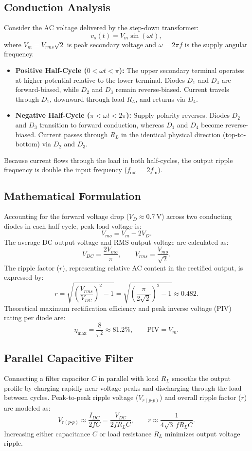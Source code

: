 \subsection{Conduction Analysis}
Consider the AC voltage delivered by the step-down transformer:
\[
v_s(t) = V_m \sin(\omega t),
\]
where $V_m = V_{rms}\sqrt{2}$ is peak secondary voltage and $\omega = 2\pi f$ is the supply angular frequency.
\begin{itemize}
	\item \textbf{Positive Half-Cycle ($0 < \omega t < \pi$):} The upper secondary terminal operates at higher potential relative to the lower terminal. Diodes $D_1$ and $D_4$ are forward-biased, while $D_2$ and $D_3$ remain reverse-biased. Current travels through $D_1$, downward through load $R_L$, and returns via $D_4$.
	\item \textbf{Negative Half-Cycle ($\pi < \omega t < 2\pi$):} Supply polarity reverses. Diodes $D_2$ and $D_3$ transition to forward conduction, whereas $D_1$ and $D_4$ become reverse-biased. Current passes through $R_L$ in the identical physical direction (top-to-bottom) via $D_2$ and $D_3$.
\end{itemize}
Because current flows through the load in both half-cycles, the output ripple frequency is double the input frequency ($f_{\text{out}} = 2 f_{\text{in}}$).

\subsection{Mathematical Formulation}
Accounting for the forward voltage drop ($V_D \approx \qty{0.7}{\volt}$) across two conducting diodes in each half-cycle, peak load voltage is:
\[
V_{mo} = V_m - 2V_D.
\]
The average DC output voltage and RMS output voltage are calculated as:
\[
V_{DC} = \frac{2V_{mo}}{\pi}, \qquad V_{rms} = \frac{V_{mo}}{\sqrt{2}}.
\]
The ripple factor ($r$), representing relative AC content in the rectified output, is expressed by:
\[
r = \sqrt{\left(\frac{V_{rms}}{V_{DC}}\right)^2 - 1} = \sqrt{\left(\frac{\pi}{2\sqrt{2}}\right)^2-1} \approx 0.482.
\]
Theoretical maximum rectification efficiency and peak inverse voltage (PIV) rating per diode are:
\[
\eta_{\max} = \frac{8}{\pi^2}\approx 81.2\%, \qquad \text{PIV} = V_m.
\]

\subsection{Parallel Capacitive Filter}
Connecting a filter capacitor $C$ in parallel with load $R_L$ smooths the output profile by charging rapidly near voltage peaks and discharging through the load between cycles. Peak-to-peak ripple voltage ($V_{r(p\text{-}p)}$) and overall ripple factor ($r$) are modeled as:
\[
V_{r(p\text{-}p)} \approx \frac{I_{DC}}{2fC} = \frac{V_{DC}}{2fR_LC}, \qquad r \approx \frac{1}{4\sqrt{3}\,fR_LC}.
\]
Increasing either capacitance $C$ or load resistance $R_L$ minimizes output voltage ripple.

